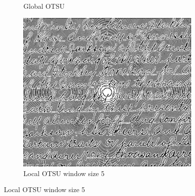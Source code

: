 \documentclass[UTF8]{ctexart}
\begin{document}
\begin{figure}[htbp]
\begin{subfigure}{0.3\textwidth}
        \caption{Global OTSU}
    \end{subfigure}%
    \hfill
    \begin{subfigure}{0.3\textwidth}
        \centering
        \includegraphics[width=\linewidth]{local_otsu5.jpg}
        \caption{Local OTSU window size 5}
    \end{subfigure}

    \vspace{0.5cm} %


\end{figure}
\end{document}
